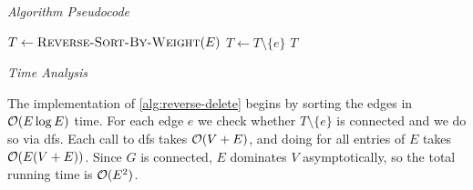 \documentclass{article}
\begin{document}
\begin{enumerate}[leftmargin={*}, font={\bf}, label={\arabic*.}, ref={\arabic*}]
    \bigskip

    {\itshape Algorithm Pseudocode} \vspace{-\baselineskip}

    \begin{minipage}{\linewidth}
      \begin{algorithm}[H]
        \caption{$\textsc{Minimum-Spanning-Tree}(G \gets (V, E))$}\label{alg:reverse-delete}
        \begin{algorithmic}[1]
          \State $T \gets \Call{Reverse-Sort-By-Weight}{E}$
              \State $T \gets T \setminus \{e\}$
            \EndIf
          \EndFor
          \State \Return $T$
        \end{algorithmic}
      \end{algorithm}
    \end{minipage}
    
    \bigskip

    {\itshape Time Analysis}

    The implementation of \autoref{alg:reverse-delete} begins by sorting the edges in $\operatorname*{\mathcal{O}}(E \log E)$
    time. For each edge $e$ we check whether $T \setminus \{e\}$ is connected and we do so via {\sc
    dfs}. Each call to {\sc dfs} takes $\operatorname*{\mathcal{O}}(V+E)$, and doing for all entries of $E$ takes $\operatorname*{\mathcal{O}}(E(V+E))$.
    Since $G$ is connected, $E$ dominates $V$ asymptotically, so the total running time is $\operatorname*{\mathcal{O}}(E^2)$.
\end{enumerate}
\end{document}
